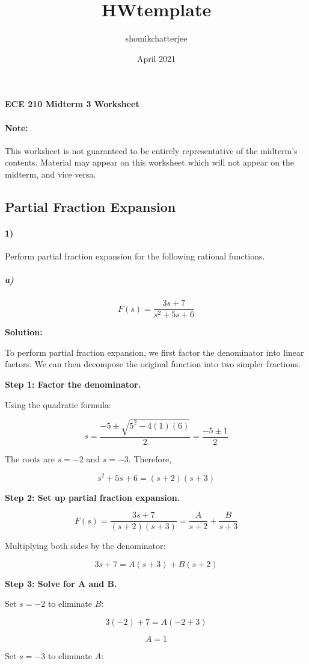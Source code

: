 \documentclass{article}
\title{HWtemplate}
\author{shomikchatterjee }
\date{April 2021}
\begin{document}
\begin{center}
\textbf{
{\Large ECE 210 Midterm 3 Worksheet}
}
\end{center} 
\noindent\makebox[\linewidth]{\rule{\linewidth}{0.4pt}}

\paragraph{Note:} This worksheet is not guaranteed to be entirely representative of the midterm's contents. Material may appear on this worksheet which will not appear on the midterm, and vice versa.


\subsection*{Partial Fraction Expansion}

\paragraph{1)} Perform partial fraction expansion for the following rational functions.

\subparagraph{a)}
\[
F(s) = \frac{3s+7}{s^2+5s+6}
\]

\textbf{Solution:}

To perform partial fraction expansion, we first factor the denominator into linear factors. We can then decompose the original function into two simpler fractions.

\textbf{Step 1: Factor the denominator.}

Using the quadratic formula:

\[
s = \frac{-5\pm\sqrt{5^2-4(1)(6)}}{2}
= \frac{-5\pm1}{2}
\]

The roots are $s=-2$ and $s=-3$. Therefore,

\[
s^2+5s+6=(s+2)(s+3)
\]

\textbf{Step 2: Set up partial fraction expansion.}

\[
F(s)
=\frac{3s+7}{(s+2)(s+3)}
=\frac{A}{s+2}+\frac{B}{s+3}
\]

Multiplying both sides by the denominator:

\[
3s+7=A(s+3)+B(s+2)
\]

\textbf{Step 3: Solve for A and B.}

Set $s=-2$ to eliminate $B$:

\[
3(-2)+7=A(-2+3)
\]

\[
\boxed{A=1}
\]

Set $s=-3$ to eliminate $A$:
\end{document}
